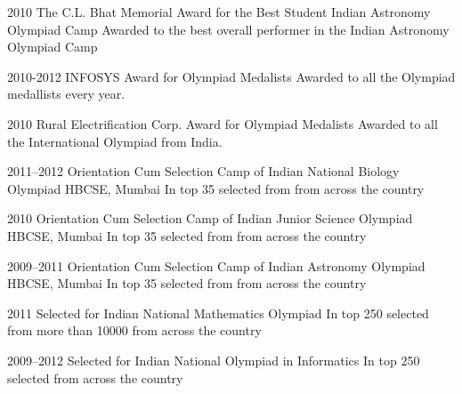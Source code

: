 \documentclass[11pt]{friggeri-cv}%
\begin{document}
\begin{entrylist}
  \entryy
    {2010}
    {The C.L. Bhat Memorial Award for the Best Student}
    {Indian Astronomy Olympiad Camp}
    {Awarded to the best overall performer in the Indian Astronomy Olympiad Camp}

\end{entrylist}

\begin{entrylist}
  \entryy
    {2010-2012}
    {INFOSYS Award for Olympiad Medalists}
    {}
    {Awarded to all the Olympiad medallists every year.}
\end{entrylist}

\begin{entrylist}
  \entryy
    {2010}
    {Rural Electrification Corp. Award for Olympiad Medalists}
    {}
    {Awarded to all the International Olympiad from India.}
\end{entrylist}


\begin{entrylist}
  \entryy
    {2011--2012}
    {Orientation Cum Selection Camp of Indian National Biology Olympiad}
    {HBCSE, Mumbai}
    {In top 35 selected from  from across the country}

\end{entrylist}


\begin{entrylist}
  \entryy
    {2010}
    {Orientation Cum Selection Camp of Indian Junior Science Olympiad}
    {HBCSE, Mumbai}
    {In top 35  selected from  from across the country}

\end{entrylist}

\begin{entrylist}
  \entryy
    {2009--2011}
    {Orientation Cum Selection Camp of Indian Astronomy Olympiad}
    {HBCSE, Mumbai}
    {In top 35 selected from  from across the country}

\end{entrylist}

\begin{entrylist}
  \entryy
    {2011}
    {Selected for Indian National Mathematics Olympiad}{}
    {In top 250 selected from more than 10000 from across the country}

\end{entrylist}

\begin{entrylist}
  \entryy
    {2009--2012}
    {Selected for Indian National Olympiad in Informatics}
    {}
    {In top 250  selected from across the country}
\end{entrylist}
\end{document}
